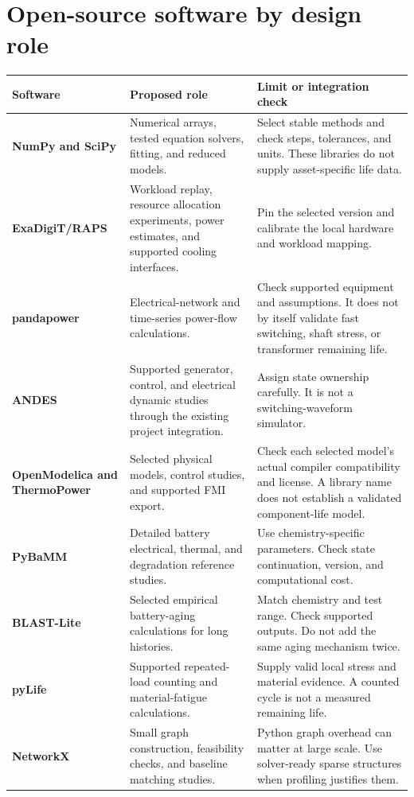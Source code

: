 \documentclass[11pt,a4paper]{report}
\begin{document}
\section{Open-source software by design role}
\begin{longtable}{L{0.23\textwidth}L{0.32\textwidth}L{0.33\textwidth}}
\toprule Software & Proposed role & Limit or integration check \\ \midrule\endhead
\textbf{NumPy and SciPy} & Numerical arrays, tested equation solvers, fitting, and reduced models. & Select stable methods and check steps, tolerances, and units. These libraries do not supply asset-specific life data. \\
\textbf{ExaDigiT/RAPS} & Workload replay, resource allocation experiments, power estimates, and supported cooling interfaces. & Pin the selected version and calibrate the local hardware and workload mapping. \\
\textbf{pandapower} & Electrical-network and time-series power-flow calculations. & Check supported equipment and assumptions. It does not by itself validate fast switching, shaft stress, or transformer remaining life. \\
\textbf{ANDES} & Supported generator, control, and electrical dynamic studies through the existing project integration. & Assign state ownership carefully. It is not a switching-waveform simulator. \\
\textbf{OpenModelica and ThermoPower} & Selected physical models, control studies, and supported FMI export. & Check each selected model's actual compiler compatibility and license. A library name does not establish a validated component-life model. \\
\textbf{PyBaMM} & Detailed battery electrical, thermal, and degradation reference studies. & Use chemistry-specific parameters. Check state continuation, version, and computational cost. \\
\textbf{BLAST-Lite} & Selected empirical battery-aging calculations for long histories. & Match chemistry and test range. Check supported outputs. Do not add the same aging mechanism twice. \\
\textbf{pyLife} & Supported repeated-load counting and material-fatigue calculations. & Supply valid local stress and material evidence. A counted cycle is not a measured remaining life. \\
\textbf{NetworkX} & Small graph construction, feasibility checks, and baseline matching studies. & Python graph overhead can matter at large scale. Use solver-ready sparse structures when profiling justifies them. \\

\end{longtable}
\end{document}
